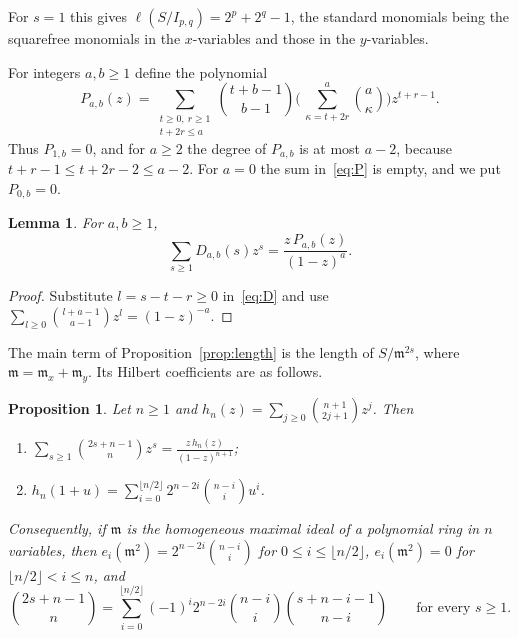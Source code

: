 \documentclass{amsart}
\newtheorem{proposition}[theorem]{Proposition}
\newtheorem{lemma}[theorem]{Lemma}
\theoremstyle{definition}
\theoremstyle{remark}
\numberwithin{equation}{section}
\newcommand{\mm}{\mathfrak{m}}
\newcommand{\fl}[1]{\lfloor #1\rfloor}
\begin{document}
For $s=1$ this gives $\ell(S/I_{p,q})=2^p+2^q-1$, the standard monomials being
the squarefree monomials in the $x$-variables and those in the $y$-variables.

For integers $a,b\ge1$ define the polynomial
\begin{equation}\label{eq:P}
  P_{a,b}(z)=\sum_{\substack{t\ge0,\ r\ge1\\ t+2r\le a}}
  \binom{t+b-1}{b-1}\Biggl(\,\sum_{\kappa=t+2r}^{a}\binom{a}{\kappa}\Biggr)z^{t+r-1}.
\end{equation}
Thus $P_{1,b}=0$, and for $a\ge2$ the degree of $P_{a,b}$ is at most $a-2$,
because $t+r-1\le t+2r-2\le a-2$. For $a=0$ the sum in~\eqref{eq:P} is
empty, and we put $P_{0,b}=0$.

\begin{lemma}\label{lem:Dseries}
For $a,b\ge1$,
\[
  \sum_{s\ge1}D_{a,b}(s)z^s=\frac{z\,P_{a,b}(z)}{(1-z)^a}.
\]
\end{lemma}

\begin{proof}
Substitute $l=s-t-r\ge0$ in~\eqref{eq:D} and use
$\sum_{l\ge0}\binom{l+a-1}{a-1}z^l=(1-z)^{-a}$.
\end{proof}

The main term of Proposition~\ref{prop:length} is the length of $S/\mm^{2s}$,
where $\mm=\mm_x+\mm_y$. Its Hilbert coefficients are as follows.

\begin{proposition}\label{prop:square}
Let $n\ge1$ and $h_n(z)=\sum_{j\ge0}\binom{n+1}{2j+1}z^j$. Then
\begin{enumerate}[label=\textup{(\roman*)}]
\item $\displaystyle\sum_{s\ge1}\binom{2s+n-1}{n}z^s=\frac{z\,h_n(z)}{(1-z)^{n+1}}$;
\item $\displaystyle h_n(1+u)=\sum_{i=0}^{\fl{n/2}}2^{n-2i}\binom{n-i}{i}u^i$.
\end{enumerate}
Consequently, if $\mm$ is the homogeneous maximal ideal of a polynomial ring in
$n$ variables, then $e_i(\mm^2)=2^{n-2i}\binom{n-i}{i}$ for $0\le i\le\fl{n/2}$,
$e_i(\mm^2)=0$ for $\fl{n/2}<i\le n$, and
\[
  \binom{2s+n-1}{n}=\sum_{i=0}^{\fl{n/2}}(-1)^i2^{n-2i}\binom{n-i}{i}\binom{s+n-i-1}{n-i}
  \qquad\text{for every }s\ge1.
\]
\end{proposition}
\end{document}
